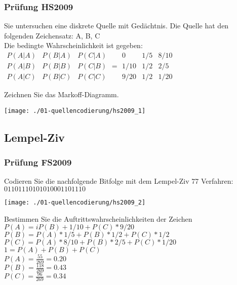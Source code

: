 \subsubsection{Prüfung HS2009}
Sie untersuchen eine diskrete Quelle mit Gedächtnis. Die Quelle hat den folgenden Zeichensatz: A, B, C\\
Die bedingte Wahrscheinlichkeit ist gegeben:\\
$\begin{matrix}
    P(A|A) & P(B|A) & P(C|A)\\
    P(A|B) & P(B|B) & P(C|B)\\
    P(A|C) & P(B|C) & P(C|C)
\end{matrix} = \begin{matrix}
    0 & 1/5 & 8/10\\
    1/10 & 1/2 & 2/5\\
    9/20 & 1/2 & 1/20
\end{matrix}$

Zeichnen Sie das Markoff-Diagramm.
\begin{center}
    \vspace{-8pt}
    \texttt{[image: ./01-quellencodierung/hs2009\_1]}
    \vspace{-8pt}
\end{center}

\subsection{Lempel-Ziv}
\subsubsection{Prüfung FS2009}
Codieren Sie die nachfolgende Bitfolge mit dem Lempel-Ziv 77 Verfahren:\\
$01101110101010001101110$
\begin{center}
    \vspace{-8pt}
    \texttt{[image: ./01-quellencodierung/hs2009\_2]}
    \vspace{-8pt}
\end{center}

Bestimmen Sie die Auftrittswahrscheinlichkeiten der Zeichen\\
$P(A)=iP(B)+1/10+P(C)*9/20$\\
$P(B)=P(A)*1/5+P(B)*1/2+P(C)*1/2$\\
$P(C)=P(A)*8/10+P(B)*2/5+P(C)*1/20$\\
$1=P(A)+P(B)+P(C)$\\

$P(A)=\frac{55}{269}=0.20$\\
$P(B)=\frac{118}{269}=0.43$\\
$P(C)=\frac{96}{269}=0.34$






